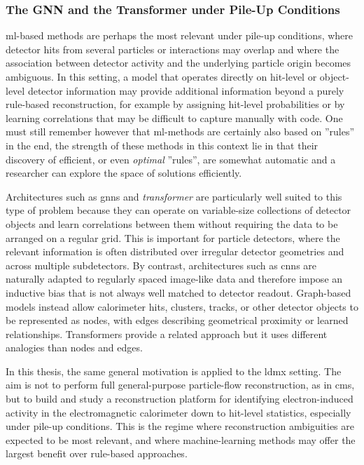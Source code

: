 \subsubsection{The GNN and the Transformer under Pile-Up Conditions}

\gls{ml}-based methods are perhaps the most relevant under pile-up conditions, where detector hits from several particles or interactions may overlap and where the association between detector activity and the underlying particle origin becomes ambiguous. In this setting, a model that operates directly on hit-level or object-level detector information may provide additional information beyond a purely rule-based reconstruction, for example by assigning hit-level probabilities or by learning correlations that may be difficult to capture manually with code. One must still remember however that \gls{ml}-methods are certainly also based on ''rules'' in the end, the strength of these methods in this context lie in that their discovery of efficient, or even \textit{optimal} ''rules'', are somewhat automatic and a researcher can explore the space of solutions efficiently.

Architectures such as \glspl{gnn} and \textit{transformer} are particularly well suited to this type of problem because they can operate on variable-size collections of detector objects and learn correlations between them without requiring the data to be arranged on a regular grid. This is important for particle detectors, where the relevant information is often distributed over irregular detector geometries and across multiple subdetectors. By contrast, architectures such as \glspl{cnn} are naturally adapted to regularly spaced image-like data and therefore impose an inductive bias that is not always well matched to detector readout. Graph-based models instead allow calorimeter hits, clusters, tracks, or other detector objects to be represented as nodes, with edges describing geometrical proximity or learned relationships. Transformers provide a related approach but it uses different analogies than nodes and edges. 

In this thesis, the same general motivation is applied to the \gls{ldmx} setting. The aim is not to perform full general-purpose particle-flow reconstruction, as in \gls{cms}, but to build and study a reconstruction platform for identifying electron-induced activity in the electromagnetic calorimeter down to hit-level statistics, especially under pile-up conditions. This is the regime where reconstruction ambiguities are expected to be most relevant, and where machine-learning methods may offer the largest benefit over rule-based approaches.

